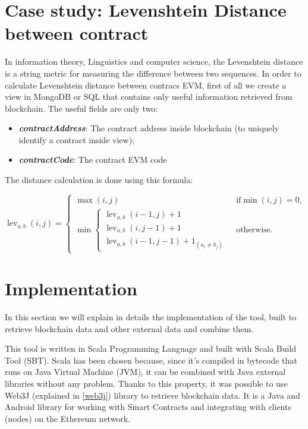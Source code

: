 \section{Case study: Levenshtein Distance between contract}
In information theory, Linguistics and computer science, the Levenshtein distance is a string metric for measuring the difference between two sequences.
In order to calculate Levenshtein distance between contracs EVM, first of all we create a view in MongoDB or SQL that contains only useful information retrieved from blockchain.
The useful fields are only two:
\begin{itemize}
    \item \textit{\textbf{contractAddress}}: The contract address inside blockchain (to uniquely identify a contract inside view);
    \item \textit{\textbf{contractCode}}: The contract EVM code
\end{itemize}
The distance calculation is done using this formula:
\begin{center}
$\operatorname{lev}_{a,b}(i,j) = 
\begin{cases}
  \max(i,j) & \text{ if} \min(i,j)=0, \\
  \min \begin{cases}
      \operatorname{lev}_{a,b}(i-1,j) + 1 \\
      \operatorname{lev}_{a,b}(i,j-1) + 1 \\
      \operatorname{lev}_{a,b}(i-1,j-1) + 1_{(a_i \neq b_j)}
   \end{cases} & \text{ otherwise.}
\end{cases}
$
\end{center}


\section{Implementation}
In this section we will explain in details the implementation of the tool, built to retrieve blockchain data and other external data and combine them.

This tool is written in Scala Programming Language and built with Scala Build Tool (SBT). Scala has been chosen because, since it's compiled in bytecode that runs on Java Virtual Machine (JVM), it can be combined with Java external libraries without any problem. \newline
Thanks to this property, it was possible to use Web3J (explained in \ref{web3j}) library to retrieve blockchain data. It is a Java and Android library for working with Smart Contracts and integrating with clients (nodes) on the Ethereum network.

